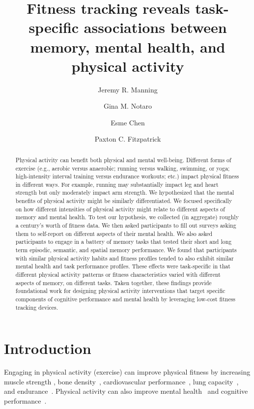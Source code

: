 \documentclass[10pt]{article}
\title{Fitness tracking reveals task-specific associations between
  memory, mental health, and physical activity}
\author[1, $\star$]{Jeremy R. Manning}
\author[1]{Gina M. Notaro}
\author[1]{Esme Chen}
\author[1]{Paxton C. Fitzpatrick}
\affil[1]{Dartmouth College, Hanover, NH}
\affil[$\star$]{Address correspondence to
  jeremy.r.manning@dartmouth.edu}
\begin{document}
\maketitle

\newpage
\begin{abstract}
  Physical activity can benefit both physical and mental well-being.
  Different forms of exercise (e.g., aerobic versus anaerobic; running
  versus walking, swimming, or yoga; high-intensity interval training
  versus endurance workouts; etc.) impact physical fitness in
  different ways.  For example, running may substantially impact leg
  and heart strength but only moderately impact arm strength. We
  hypothesized that the mental benefits of physical activity might be similarly
  differentiated.  We focused specifically on how different intensities of
  physical activity might relate to different aspects of memory and mental
  health.  To test our hypothesis, we collected (in aggregate) roughly
  a century's worth of fitness data.  We then asked participants to
  fill out surveys asking them to self-report on different aspects of
  their mental health.  We also asked participants to engage in a
  battery of memory tasks that tested their short and long term
  episodic, semantic, and spatial memory performance.  We found that
  participants with similar physical activity habits and fitness profiles
  tended to also exhibit similar mental health and task performance
  profiles.  These effects were task-specific in that different
  physical activity patterns or fitness characteristics varied with different
  aspects of memory, on different tasks.  Taken together, these
  findings provide foundational work for designing physical activity
  interventions that target specific components of cognitive performance
  and mental health by leveraging low-cost fitness tracking devices.
\end{abstract}

\section*{Introduction}
Engaging in physical activity (exercise) can improve physical fitness
by increasing muscle strength \citep{RogeEvan93, Lind79, CranEtal13,
  Knut07}, bone density~\citep{ChilEtal12, BassRams94, LaynNels99},
cardiovascular performance~\citep{MaioEtal00, PollEtal00}, lung
capacity~\citep[][although see \cite{RomaEtal16}]{LazoEtal16}, and
endurance~\citep{WilmKnut03}.  Physical activity can also improve mental
health~\citep{Ragl90, MikkEtal17, TaylEtal85, DeslEtal09, Call04,
  PaluSchw00, BassSuzu17, MorrEtal18, GordEtal17, MorrEtal22, HerrEtal10} and cognitive
performance~\citep{ChanEtal12b, BrisEtal02, EtniEtal06, BassSuzu17}.
\end{document}
